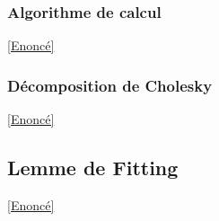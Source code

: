 \documentclass[8pt]{book}
\begin{document}
	\subsubsection{Algorithme de calcul}
	\label{Algorithme de calcul corrigé}
	\textcolor{blue}{\hyperref[Algorithme de calcul]{[Enoncé]}}\\
	
	\subsubsection{Décomposition de Cholesky}
	\label{Décomposition de Cholesky corrigé}
	\textcolor{blue}{\hyperref[Décomposition de Cholesky]{[Enoncé]}}\\
	
	\subsection{Lemme de Fitting}
	\label{Lemme de Fitting corrigé}
	\textcolor{blue}{\hyperref[Lemme de Fitting]{[Enoncé]}}\\
\end{document}
